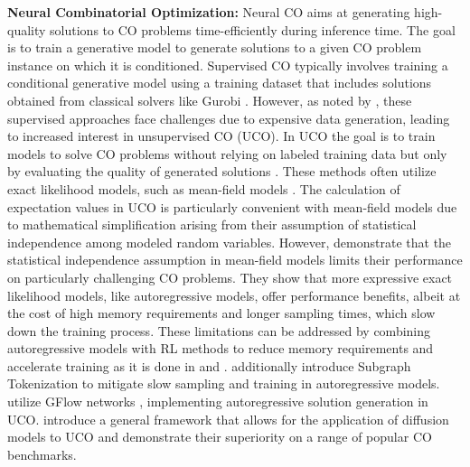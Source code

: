 \textbf{Neural Combinatorial Optimization:} Neural CO aims at generating high-quality solutions to CO problems time-efficiently during inference time.  The goal is to train a generative model to generate solutions to a given CO problem instance on which it is conditioned. Supervised CO \citep{DIFUSCO, INTEL, DGL} typically involves training a conditional generative model using a training dataset that includes solutions obtained from classical solvers like Gurobi \citep{gurobi}.
However, as noted by \citet{yehuda_its_2020}, these supervised approaches face challenges due to expensive data generation, leading to increased interest in unsupervised CO (UCO). In UCO the goal is to train models to solve CO problems without relying on labeled training data but only by evaluating the quality of generated solutions \cite{bengio2021machine}. These methods often utilize exact likelihood models, such as mean-field models \citep{karalias_erdos_2020, sun_annealed_2022, wang_unsupervised_2023}. The calculation of expectation values in UCO is particularly convenient with mean-field models due to mathematical simplification arising from their assumption of statistical independence among modeled random variables. However, \citet{VAG-CO} demonstrate that the statistical independence assumption in mean-field models limits their performance on particularly challenging CO problems. They show that more expressive exact likelihood models, like autoregressive models, offer performance benefits, albeit at the cost of high memory requirements and longer sampling times, which slow down the training process.
These limitations can be addressed by combining autoregressive models with RL methods to reduce memory requirements and accelerate training as it is done in \citet{khalil_learning_2017-1} and \cite{VAG-CO}. \citet{VAG-CO} additionally introduce Subgraph Tokenization to mitigate slow sampling and training in autoregressive models. \citet{gflow_2023} utilize GFlow networks \citep{Gflow_foundations}, implementing autoregressive solution generation in UCO. \citet{sanokowski2024diffusion} introduce a general framework that allows for the application of diffusion models to UCO and demonstrate their superiority on a range of popular CO benchmarks.


